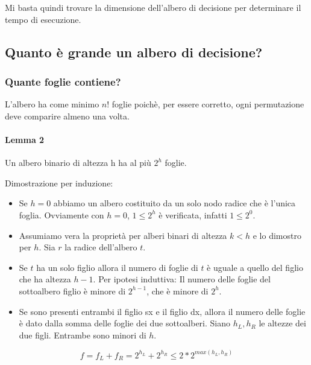 \documentclass[tikz]{article}
\providecommand{\tightlist}{%
  \setlength{\itemsep}{0pt}\setlength{\parskip}{0pt}}
\let\oldparagraph\paragraph
\renewcommand{\paragraph}[1]{\oldparagraph{#1}\mbox{}}
\begin{document}
{Mi basta quindi trovare la dimensione dell'albero di decisione per
determinare il tempo di esecuzione.}

\subsection{Quanto è grande un albero di decisione?}

\subsubsection{Quante foglie contiene?}

{L'albero ha come minimo $n!$ foglie poichè, per essere corretto, ogni permutazione deve comparire almeno una volta.}

\paragraph{Lemma 2}

{Un albero binario di altezza h ha al più $2^h$ foglie.}

{Dimostrazione per induzione:}

\begin{itemize}
\tightlist
\item
  {Se $h=0$ abbiamo un albero costituito da un solo nodo radice che è l'unica foglia. Ovviamente con $h=0$, $1 \leq 2^h$ è verificata, infatti $1\leq 2^0$.}
\item
  {Assumiamo vera la proprietà per alberi binari di altezza $k<h$ e lo dimostro per $h$. Sia $r$ la radice dell'albero $t$. }
\end{itemize}

\begin{itemize}
\tightlist
\item
  {Se $t$ ha un solo figlio allora il numero di foglie di $t$ è uguale a quello del figlio che ha altezza $h-1$. }{Per ipotesi induttiva}{: Il numero delle foglie del sottoalbero figlio è minore di $2^{h-1}$, che è minore di $2^h$.}
\item
  {Se sono presenti entrambi il figlio sx e il figlio dx, allora il numero delle foglie è dato dalla somma delle foglie dei due sottoalberi. Siano $h_L,h_R$ le altezze dei due figli. Entrambe sono minori di $h$.}
\end{itemize}

\begin{equation}
f=f_L+f_R = 2^{h_L} + 2^{h_R} \leq 2 * 2^{max(h_L,h_R)}
\end{equation}
\end{document}

